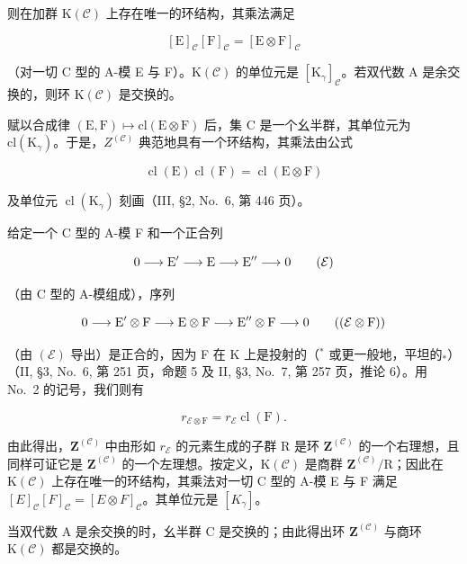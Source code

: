 则在加群 \(\mathrm{K}(\mathcal{C})\) 上存在唯一的环结构，其乘法满足

\[
[ \mathrm{E} ] _ {\mathcal {C}} [ \mathrm{F} ] _ {\mathcal {C}} = [ \mathrm{E} \otimes \mathrm{F} ] _ {\mathcal {C}}
\]

（对一切 C 型的 A-模 E 与 F）。\(\mathrm{K}(\mathcal{C})\) 的单位元是 \([\mathrm{K}_{\gamma}]_{\mathcal{C}}\)。若双代数 A 是余交换的，则环 \(\mathrm{K}(\mathcal{C})\) 是交换的。

赋以合成律 \((\mathrm{E},\mathrm{F})\mapsto\mathrm{cl}(\mathrm{E}\otimes\mathrm{F})\) 后，集 C 是一个幺半群，其单位元为 \(\mathrm{cl}(\mathrm{K}_{\gamma})\)。于是，\(Z^{(\mathcal{C})}\) 典范地具有一个环结构，其乘法由公式

\[
\operatorname{cl} (\mathrm{E}) \operatorname{cl} (\mathrm{F}) = \operatorname{cl} (\mathrm{E} \otimes \mathrm{F})\tag{13}
\]

及单位元 \(\operatorname{cl}(\mathrm{K}_{\gamma})\) 刻画（III, §2, No.~6, 第 446 页）。

给定一个 C 型的 A-模 F 和一个正合列

\[
0 \longrightarrow \mathrm{E} ^ {\prime} \longrightarrow \mathrm{E} \longrightarrow \mathrm{E} ^ {\prime \prime} \longrightarrow 0\tag{\( \mathcal{E} \)}
\]

（由 C 型的 A-模组成），序列

\[
0 \longrightarrow \mathrm{E} ^ {\prime} \otimes \mathrm{F} \longrightarrow \mathrm{E} \otimes \mathrm{F} \longrightarrow \mathrm{E} ^ {\prime \prime} \otimes \mathrm{F} \longrightarrow 0\tag{\(\left(\mathcal{E}\otimes \mathrm{F}\right)\)}
\]

（由 \((\mathcal{E})\) 导出）是正合的，因为 F 在 K 上是投射的（\(^{*}\) 或更一般地，平坦的\(_{*}\)）（II, §3, No.~6, 第 251 页，命题 5 及 II, §3, No.~7, 第 257 页，推论 6）。用 No.~2 的记号，我们则有

\[
r _ {\mathcal {E} \otimes \mathrm{F}} = r _ {\mathcal {E}} \operatorname{cl} (\mathrm{F}).\tag{14}
\]

由此得出，\(\mathbf{Z}^{(\mathcal{C})}\) 中由形如 \(r_{\mathcal{E}}\) 的元素生成的子群 R 是环 \(\mathbf{Z}^{(\mathcal{C})}\) 的一个右理想，且同样可证它是 \(\mathbf{Z}^{(\mathcal{C})}\) 的一个左理想。按定义，\(\mathrm{K}(\mathcal{C})\) 是商群 \(\mathbf{Z}^{(\mathcal{C})}/\mathrm{R}\)；因此在 \(\mathrm{K}(\mathcal{C})\) 上存在唯一的环结构，其乘法对一切 C 型的 A-模 E 与 F 满足 \([E]_{\mathcal{C}}[F]_{\mathcal{C}} = [E \otimes F]_{\mathcal{C}}\)。其单位元是 \([K_{\gamma}]\)。

当双代数 A 是余交换的时，幺半群 C 是交换的；由此得出环 \(\mathbf{Z}^{(\mathcal{C})}\) 与商环 \(\mathrm{K}(\mathcal{C})\) 都是交换的。

